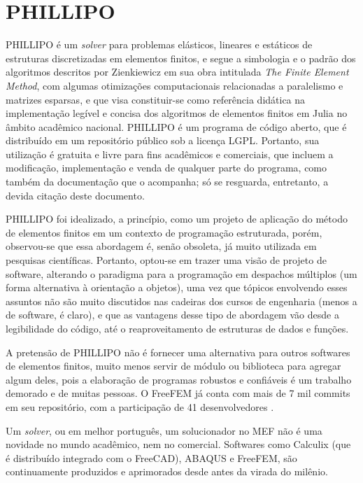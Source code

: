 

\chapter{PHILLIPO}

PHILLIPO é um \emph{solver} para problemas elásticos, lineares e estáticos de estruturas discretizadas em elementos finitos, e segue a simbologia e o padrão dos algoritmos descritos por Zienkiewicz em sua obra intitulada \emph{The Finite Element Method}, com algumas otimizações computacionais relacionadas a paralelismo e matrizes esparsas, e que visa constituir-se como referência didática na implementação legível e concisa dos algoritmos de elementos finitos em Julia no âmbito acadêmico nacional. PHILLIPO é um programa de código aberto, que é distribuído em um repositório público\footnotemark[1]{} sob a licença LGPL\footnotemark[2]{}. Portanto, sua utilização é gratuita e livre para fins acadêmicos e comerciais, que incluem a modificação, implementação e venda de qualquer parte do programa, como também da documentação que o acompanha; só se resguarda, entretanto, a devida citação deste documento.

PHILLIPO foi idealizado, a princípio, como um projeto de aplicação do método de elementos finitos em um contexto de programação estruturada, porém, observou-se que essa abordagem é, senão obsoleta, já muito utilizada em pesquisas científicas. Portanto, optou-se em trazer uma visão de projeto de software, alterando o paradigma para a programação em despachos múltiplos (um forma alternativa à orientação a objetos), uma vez que tópicos envolvendo esses assuntos não são muito discutidos nas cadeiras dos cursos de engenharia (menos a de software, é claro), e que as vantagens desse tipo de abordagem vão desde a legibilidade do código, até o reaproveitamento de estruturas de dados e funções. \cite{Bezanson}

A pretensão de PHILLIPO não é fornecer uma alternativa para outros softwares de elementos finitos, muito menos servir de módulo ou biblioteca para agregar algum deles, pois a elaboração de programas robustos e confiáveis é um trabalho demorado e de muitas pessoas. O FreeFEM já conta com mais de 7 mil commits em seu repositório, com a participação de 41 desenvolvedores \cite{Hecht}.

Um \emph{solver}, ou em melhor português, um solucionador no MEF não é uma novidade no mundo acadêmico, nem no comercial. Softwares como Calculix (que é distribuído integrado com o FreeCAD), ABAQUS e FreeFEM, são continuamente produzidos e aprimorados desde antes da virada do milênio. 